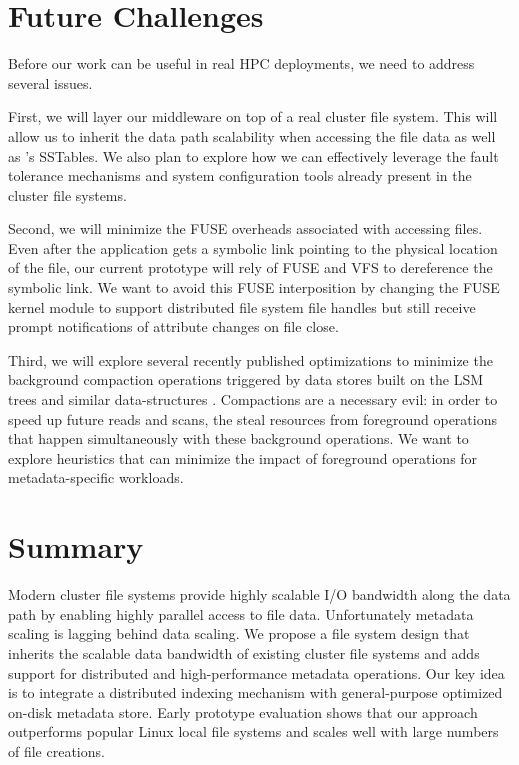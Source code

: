 \section{Future Challenges}
\label{futurework}

Before our work can be useful in real HPC deployments, we need to address
several issues. 

First, we will layer our middleware on top of a real cluster file system.
This will allow us to inherit the data path scalability when accessing the 
file data as well as \ldb's SSTables. We also plan to explore how
we can effectively leverage the fault tolerance mechanisms and system
configuration tools already present in the cluster file systems.

Second, we will minimize the FUSE overheads associated with accessing files.
Even after the application gets a symbolic link pointing to the physical
location of the file, our current prototype will rely of FUSE and VFS to
dereference the symbolic link. We want to avoid this FUSE
interposition by changing the FUSE kernel module to support distributed file
system file handles but still receive prompt notifications of attribute changes
on file close.

Third, we will explore several recently published optimizations to minimize the
background compaction operations triggered by data stores built on the LSM
trees and similar data-structures \cite{blsm, tokufs, Bender2007}. 
Compactions are a necessary evil: in order to speed up future reads and
scans, the steal resources from foreground operations that happen
simultaneously with these background operations. We want to explore heuristics
that can minimize the impact of foreground operations for metadata-specific
workloads.

\section{Summary}
\label{summary}

Modern cluster file systems provide highly scalable I/O bandwidth along the
data path by enabling highly parallel access to file data.
Unfortunately metadata scaling is lagging behind data scaling.
We propose a file system design that 
inherits the scalable data bandwidth of existing cluster file systems
and adds support for distributed and high-performance metadata operations.
Our key idea is to integrate a distributed indexing mechanism with general-purpose
optimized on-disk metadata store.
Early prototype evaluation shows that our approach outperforms popular Linux
local file systems and scales well with large numbers of file creations. 




